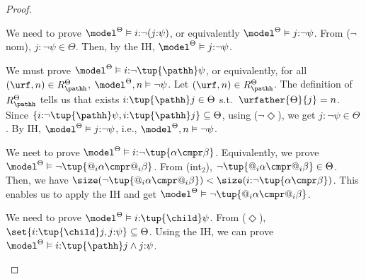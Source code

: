 \begin{proof}
\begin{description}
\begin{description}
                We need to prove $\model^{\Theta} \vDash {i{:}\lnot(j{:}\psi)}$, or equivalently
                    $\model^{\Theta} \vDash {j{:}\lnot\psi}$.
                From ($\lnot$nom), $j{:}\lnot\psi \in \Theta$.
                Then, by the IH, $\model^{\Theta} \vDash j{:}\lnot \psi$.
            \item[($\varphi = i{:}\lnot \tup{\pathh} \psi$)]
                We must prove $\model^{\Theta} \vDash {i{:}\lnot \tup{\pathh}\psi}$, or equivalently,
                for all $(\urf,n) \in R^{\Theta}_{\pathh}$, ${\model^{\Theta}, n \vDash \lnot\psi}$.
                Let $(\urf,n) \in R^{\Theta}_{\pathh}$.
                The definition of $R^{\Theta}_{\pathh}$ tells us that exists $i{:}\tup{\pathh}j \in \Theta$ s.t.\ $\urfather{\Theta}{j} = n$.
                Since $\{i{:}\lnot\tup{\pathh}\psi, i{:}\tup{\pathh}j\} \subseteq \Theta$, using ($\lnot \Diamond$), we get $j{:}\lnot\psi \in\Theta$.
                By IH, $\model^\Theta \vDash j{:}\lnot \psi$, i.e., $\model^\Theta, n \vDash \lnot \psi$.
            \item[($\varphi = i{:}\lnot\tup{\alpha \cmpr \beta}$)]
                We neet to prove $\model^{\Theta} \vDash i{:} \lnot \tup{\alpha \cmpr \beta}$.
                Equivalently, we prove $\model^{\Theta} \vDash {\lnot \tup{@_i\alpha \cmpr @_i\beta}}$.
                From (int$_2$), $\lnot\tup{ @_i \alpha \cmpr @_i \beta} \in \Theta$.
                Then, we have $\size(\lnot\tup{ @_i \alpha \cmpr @_i \beta}) < \size(i{:} \lnot \tup{\alpha \cmpr \beta})$.
                This enables us to apply the IH and get $\model^\Theta \vDash \lnot\tup{@_i \alpha \cmpr @_i \beta}$.
            \item[($\varphi = i{:}\tup{\child}\psi$)] 
                We need to prove $\model^{\Theta} \vDash {i{:}\tup{\child}\psi}$.
                From ($\Diamond$), $\set{i{:}\tup{\child}j, j{:}\psi} \subseteq \Theta$. 
                Using the IH, we can prove $\model^\Theta \vDash i{:}\tup{\pathh}j \land j{:}\psi$.

\end{description}
\end{description}
\end{proof}
